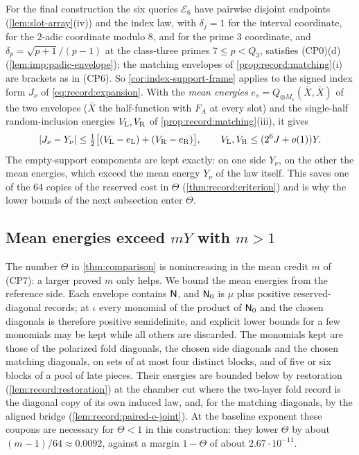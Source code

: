 For the final construction the six queries $\mathcal E_6$ have pairwise
disjoint endpoints (\cref{lem:slot-array}(iv)) and the index law, with
$\delta_j=1$ for the interval coordinate, for the $2$-adic coordinate modulo $8$, and for the prime $3$ coordinate, and
$\delta_p=\sqrt{p+1}/(p-1)$ at the class-three primes $7\le p<Q_3$, satisfies
(CP0)(d) (\cref{lem:imp:padic-envelope}); the matching envelopes of
\cref{prop:record:matching}(i) are brackets as in (CP6). So
\cref{cor:index-support-frame} applies to the signed index form $J_\nu$ of
\eqref{eq:record:expansion}. With the \emph{mean energies}
$e_s=Q_{\otimes M_s}(\bar X,\bar X)$ of the two envelopes ($\bar X$ the
half-function with $F_A$ at every slot) and the single-half random-inclusion
energies $V_{\rm L},V_{\rm R}$ of \cref{prop:record:matching}(iii), it gives
\begin{equation}\label{eq:record:cm-selected}
 |J_\nu-Y_\nu|\le\tfrac12\bigl[(V_{\rm L}-e_{\rm L})+(V_{\rm R}-e_{\rm
 R})\bigr],\qquad V_{\rm L},V_{\rm R}\le(2^6J+o(1))Y .
\end{equation}
The empty-support components are kept exactly: on one side $Y_\nu$, on the
other the mean energies, which exceed the mean energy $Y_\nu$ of the law
itself. This saves one of the $64$ copies of the reserved cost in $\Theta$
(\cref{thm:record:criterion}) and is why the lower bounds of the next
subsection enter $\Theta$.

\subsection{Mean energies exceed \texorpdfstring{$mY$}{mY} with \texorpdfstring{$m>1$}{m>1}}\label{subsec:record:positive_means}

The number $\Theta$ in \cref{thm:comparison} is nonincreasing
in the mean credit $m$ of (CP7): a larger proved $m$ only helps.
We bound
the mean energies from the reference side. Each envelope contains $\mathsf N$,
and $\mathsf N_0$ is $\mu$ plus positive reserved-diagonal records; at $\iota$
every monomial of the product of $\mathsf N_0$ and the chosen diagonals is
therefore positive semidefinite, and explicit lower bounds for a few
monomials may be kept while all others are discarded. The monomials kept are
those of the polarized fold diagonals, the chosen side diagonals and the
chosen matching diagonals, on sets of at most four distinct blocks, and of
five or six blocks of a pool of late pieces. Their energies are bounded below
by restoration (\cref{lem:record:restoration}) at the chamber cut where the
two-layer fold record is the diagonal copy of its own induced law, and, for the
matching diagonals, by the aligned bridge (\cref{lem:record:paired-e-joint}). At
the baseline exponent these coupons are necessary for
$\Theta<1$ in this construction: they lower $\Theta$ by about
$(m-1)/64\approx0.0092$, against a margin $1-\Theta$ of about
$2.67\cdot10^{-11}$.

